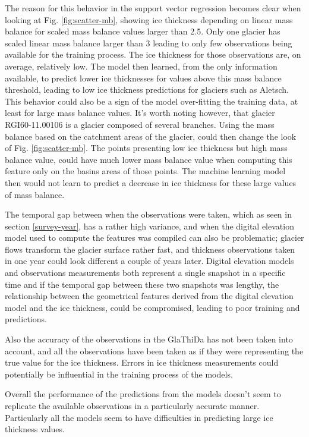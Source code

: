 The reason for this behavior in the support vector regression becomes clear when looking at Fig. \ref{fig:scatter-mb}, showing ice thickness depending on linear mass balance for scaled mass balance values larger than 2.5. Only one glacier has scaled linear mass balance larger than 3 leading to only few observations being available for the training process. The ice thickness for those observations are, on average, relatively low. The model then learned, from the only information available, to predict lower ice thicknesses for values above this mass balance threshold, leading to low ice thickness predictions for glaciers such as Aletsch. This behavior could also be a sign of the model over-fitting the training data, at least for large mass balance values. It's worth noting however, that glacier RGI60-11.00106 is a glacier composed of several branches. Using the mass balance based on the catchment areas of the glacier, could then change the look of Fig. \ref{fig:scatter-mb}. The points presenting low ice thickness but high mass balance value, could have much lower mass balance value when computing this feature only on the basins areas of those points. The machine learning model then would not learn to predict a decrease in ice thickness for these large values of mass balance. 

The temporal gap between when the observations were taken, which as seen in section \ref{survey-year}, has a rather high variance, and when the digital elevation model used to compute the features was compiled can also be problematic; glacier flows transform the glacier surface rather fast, and thickness observations taken in one year could look different a couple of years later. Digital elevation models and observations measurements both represent a single snapshot in a specific time and if the temporal gap between these two snapshots was lengthy, the relationship between the geometrical features derived from the digital elevation model and the ice thickness, could be compromised, leading to poor training and predictions.

Also the accuracy of the observations in the GlaThiDa has not been taken into account, and all the observations have been taken as if they were representing the true value for the ice thickness. Errors in ice thickness measurements could potentially be influential in the training process of the models.

Overall the performance of the predictions from the models doesn't seem to replicate the available observations in a particularly accurate manner. Particularly all the models seem to have difficulties in predicting large ice thickness values.


